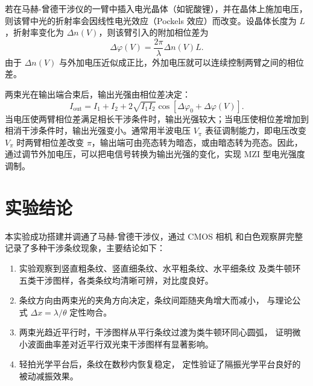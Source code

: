 \documentclass[12pt, a4paper]{article}
\begin{document}
若在马赫-曾德干涉仪的一臂中插入电光晶体（如铌酸锂），并在晶体上施加电压，则该臂中光的折射率会因线性电光效应（Pockels 效应）而改变。设晶体长度为 $L$，折射率变化为 $\Delta n(V)$，则该臂引入的附加相位差为
\begin{equation}
  \Delta\varphi(V) = \frac{2\pi}{\lambda}\Delta n(V)L .
\end{equation}
由于 $\Delta n(V)$ 与外加电压近似成正比，外加电压就可以连续控制两臂之间的相位差。

两束光在输出端合束后，输出光强由相位差决定：
\begin{equation}
  I_{\mathrm{out}} = I_1 + I_2 + 2\sqrt{I_1 I_2}
  \cos\!\left[\Delta\varphi_0 + \Delta\varphi(V)\right] .
\end{equation}
当电压使两臂相位差满足相长干涉条件时，输出光强较大；当电压使相位差增加到相消干涉条件时，输出光强变小。通常用半波电压 $V_\pi$ 表征调制能力，即电压改变 $V_\pi$ 时两臂相位差改变 $\pi$，输出端可由亮态转为暗态，或由暗态转为亮态。因此，通过调节外加电压，可以把电信号转换为输出光强的变化，实现 MZI 型电光强度调制。

\section{实验结论}

本实验成功搭建并调通了马赫-曾德干涉仪，通过 CMOS 相机
和白色观察屏完整记录了多种干涉条纹现象，主要结论如下：

\begin{enumerate}
  \item 实验观察到竖直粗条纹、竖直细条纹、水平粗条纹、水平细条纹
        及类牛顿环五类干涉图样，各类条纹均清晰可辨，对比度良好。
  \item 条纹方向由两束光的夹角方向决定，条纹间距随夹角增大而减小，
        与理论公式 $\Delta x = \lambda/\theta$ 定性吻合。
  \item 两束光趋近平行时，干涉图样从平行条纹过渡为类牛顿环同心圆弧，
        证明微小波面曲率差对近平行双光束干涉图样有显著影响。
  \item 轻拍光学平台后，条纹在数秒内恢复稳定，
        定性验证了隔振光学平台良好的被动减振效果。
\end{enumerate}
\end{document}
